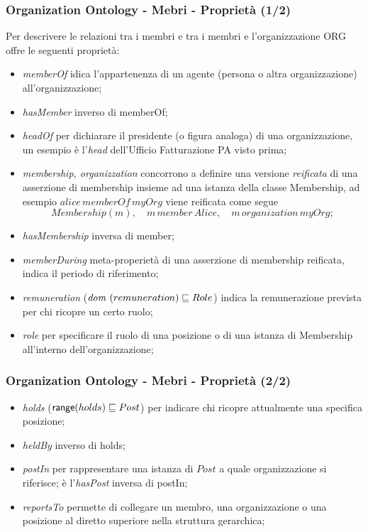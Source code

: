 \documentclass[8pt]{beamer}
\begin{document}
\begin{frame}
  \frametitle{Organization Ontology - Mebri - Propriet\`a (1/2)}
  
  Per descrivere le relazioni tra i membri e tra i membri e l'organizzazione ORG offre le seguenti propriet\`a:  
  \begin{itemize}[<+->]
   \item \emph{memberOf} idica l'appartenenza di un agente (persona o altra organizzazione) all'organizzazione;
   \item \emph{hasMember} inverso di memberOf;
   \item \emph{headOf} per dichiarare il presidente (o figura analoga) di una organizzazione, un esempio
   \`e l'\emph{head} dell'Ufficio Fatturazione PA visto prima;
   \item \emph{membership, organizzation} concorrono a definire una versione \emph{reificata} di una asserzione di
   membership insieme ad una istanza della classe Membership, ad esempio $alice\,memberOf\,myOrg$ viene
   reificata come segue
\[
  Membership(m), \quad m\,member\,Alice, \quad m\,organization\,myOrg ;
\]
  \item \emph{hasMembership} inversa di member;
  \item \emph{memberDuring} meta-properiet\`a di una asserzione di membership reificata, indica il periodo
  di riferimento;
  \item \emph{remuneration} ($\mathit{dom}~(remuneration) \sqsubseteq Role$) indica la remunerazione prevista per 
  chi ricopre un certo ruolo;
   \item \emph{role} per specificare il ruolo di una posizione o di una istanza di Membership 
   all'interno dell'organizzazione;
  \end{itemize}
\end{frame}

\begin{frame}
  \frametitle{Organization Ontology - Mebri - Propriet\`a (2/2)}
  
  \begin{itemize}[<+->]
   \item \emph{holds} ($\mathsf{range}(holds) \sqsubseteq Post$) per indicare chi ricopre attualmente 
   una specifica posizione;
   \item \emph{heldBy} inverso di holds;
   \item \emph{postIn} per rappresentare una istanza di $Post$ a quale organizzazione si riferisce;
   \`e l'\emph{hasPost} inversa di postIn;
   \item \emph{reportsTo} permette di collegare un membro, una organizzazione o una posizione
   al diretto superiore nella struttura gerarchica;
  \end{itemize}
\end{frame}
\end{document}
